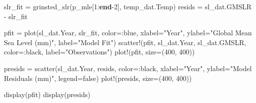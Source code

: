 \documentclass[
  letterpaper,
  DIV=11,
  numbers=noendperiod]{scrartcl}
\newenvironment{Shaded}{\begin{snugshade}}{\end{snugshade}}
\newcommand{\ConstantTok}[1]{\textcolor[rgb]{0.56,0.35,0.01}{#1}}
\newcommand{\FloatTok}[1]{\textcolor[rgb]{0.68,0.00,0.00}{#1}}
\newcommand{\FunctionTok}[1]{\textcolor[rgb]{0.28,0.35,0.67}{#1}}
\newcommand{\KeywordTok}[1]{\textcolor[rgb]{0.00,0.23,0.31}{\textbf{#1}}}
\newcommand{\NormalTok}[1]{\textcolor[rgb]{0.00,0.23,0.31}{#1}}
\newcommand{\OperatorTok}[1]{\textcolor[rgb]{0.37,0.37,0.37}{#1}}
\newcommand{\StringTok}[1]{\textcolor[rgb]{0.13,0.47,0.30}{#1}}
\begin{document}
\begin{Shaded}
\begin{Highlighting}[]
\NormalTok{slr\_fit }\OperatorTok{=} \FunctionTok{grinsted\_slr}\NormalTok{(p\_mle[}\FloatTok{1}\OperatorTok{:}\KeywordTok{end}\OperatorTok{{-}}\FloatTok{2}\NormalTok{], temp\_dat.Temp)}
\NormalTok{resids }\OperatorTok{=}\NormalTok{ sl\_dat.GMSLR }\OperatorTok{{-}}\NormalTok{ slr\_fit}

\NormalTok{pfit }\OperatorTok{=} \FunctionTok{plot}\NormalTok{(sl\_dat.Year, slr\_fit, color}\OperatorTok{=:}\NormalTok{blue, xlabel}\OperatorTok{=}\StringTok{"Year"}\NormalTok{, ylabel}\OperatorTok{=}\StringTok{"Global Mean Sea Level (mm)"}\NormalTok{, label}\OperatorTok{=}\StringTok{"Model Fit"}\NormalTok{)}
\FunctionTok{scatter!}\NormalTok{(pfit, sl\_dat.Year, sl\_dat.GMSLR, color}\OperatorTok{=:}\NormalTok{black, label}\OperatorTok{=}\StringTok{"Observations"}\NormalTok{)}
\FunctionTok{plot!}\NormalTok{(pfit, size}\OperatorTok{=}\NormalTok{(}\FloatTok{400}\NormalTok{, }\FloatTok{400}\NormalTok{))}

\NormalTok{presids }\OperatorTok{=} \FunctionTok{scatter}\NormalTok{(sl\_dat.Year, resids, color}\OperatorTok{=:}\NormalTok{black, xlabel}\OperatorTok{=}\StringTok{"Year"}\NormalTok{, ylabel}\OperatorTok{=}\StringTok{"Model Residuals (mm)"}\NormalTok{, legend}\OperatorTok{=}\ConstantTok{false}\NormalTok{)}
\FunctionTok{plot!}\NormalTok{(presids, size}\OperatorTok{=}\NormalTok{(}\FloatTok{400}\NormalTok{, }\FloatTok{400}\NormalTok{))}

\FunctionTok{display}\NormalTok{(pfit)}
\FunctionTok{display}\NormalTok{(presids)}
\end{Highlighting}
\end{Shaded}
\end{document}
